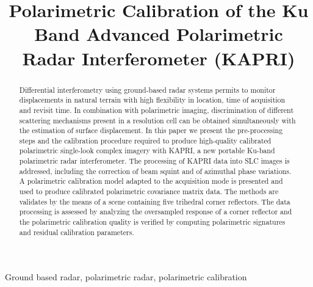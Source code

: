 \documentclass[journal, 10pt, final,letterpaper,]{IEEEtran}
\title{Polarimetric Calibration of the Ku Band Advanced Polarimetric Radar Interferometer (KAPRI)}
\author{\IEEEauthorblockN{
	Simone Baffelli,~\IEEEmembership{Student Member,~IEEE},
	Othmar Frey,~\IEEEmembership{Member,~IEEE},
	Charles Werner,~\IEEEmembership{Senior Member,~IEEE}, and
	Irena Hajnsek,~\IEEEmembership{Fellow,~IEEE}
}}
\begin{document}
\maketitle
\begin{abstract}
Differential interferometry using ground-based radar systems permits to monitor displacements in natural terrain with  high flexibility in location, time of acquisition and revisit time. In combination with polarimetric imaging, discrimination of different scattering mechanisms present in a resolution cell can be obtained simultaneously with the estimation of surface displacement.
In this paper we present the pre-processing steps and the calibration procedure required to produce high-quality calibrated polarimetric single-look complex imagery with KAPRI, a new portable Ku-band polarimetric radar interferometer. The processing of KAPRI data into SLC images is addressed, including the correction of beam squint and of azimuthal phase variations. A polarimetric calibration model adapted to the acquisition mode is presented and used to produce calibrated polarimetric covariance matrix data. The methods are validates by the means of a scene containing five trihedral corner reflectors. The data processing is assessed by analyzing the oversampled response of a corner reflector and the polarimetric calibration quality is verified by computing polarimetric signatures and residual calibration parameters.
\end{abstract}
\begin{IEEEkeywords}
Ground based radar, polarimetric radar, polarimetric calibration
\end{IEEEkeywords}






\pagebreak



\end{document}
